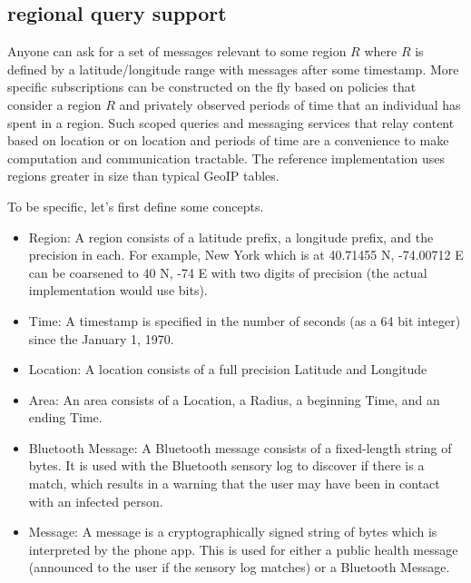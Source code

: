 \documentclass{article}
\begin{document}
\subsection{regional query support}
Anyone can ask for a set of messages relevant to some region $R$ where $R$ is defined by a latitude/longitude range with messages after some timestamp.  More specific subscriptions can be constructed on the fly based on policies that consider a region $R$ and privately observed periods of time that an individual has spent in a region. Such scoped queries and messaging services that relay content based on location or on location and periods of time are a convenience to make computation and communication tractable.  The reference implementation uses regions greater in size than typical GeoIP tables.

To be specific, let's first define some concepts.
\begin{itemize}
    \item Region: A region consists of a latitude prefix, a longitude prefix, and the precision in each.  For example, New York which is at 40.71455 N, -74.00712 E can be coarsened to 40 N, -74 E with two digits of precision (the actual implementation would use bits).
    \item Time: A timestamp is specified in the number of seconds (as a 64 bit integer) since the January 1, 1970. 
    \item Location: A location consists of a full precision Latitude and Longitude
    \item Area: An area consists of a Location, a Radius, a beginning Time, and an ending Time.
    \item Bluetooth Message: A Bluetooth message consists of a fixed-length string of bytes.  It is used with the Bluetooth sensory log to discover if there is a match, which results in a warning that the user may have been in contact with an infected person.  
    \item Message: A message is a cryptographically signed string of bytes which is interpreted by the phone app. This is used for either a public health message (announced to the user if the sensory log matches) or a Bluetooth Message. 
\end{itemize}
\end{document}
